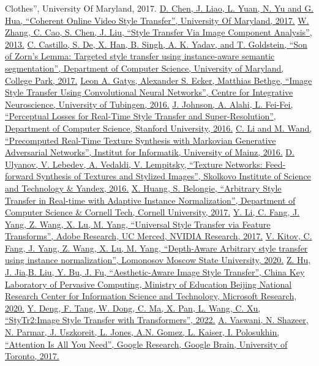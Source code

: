 \documentclass{article}
\begin{document}
\begin{thebibliography}{9}
{    Clothes”,  University Of Maryland, 2017.}
    \href{https://arxiv.org/pdf/1703.09211}{D. Chen, J. Liao, L. Yuan, N. Yu and G. Hua, “Coherent Online Video Style Transfer”,  University Of Maryland, 2017.}
     \href{https://www.researchgate.net/publication/234096926_Style_Transfer_Via_Im  age_Component_Analysis}{W. Zhang, C. Cao, S. Chen, J. Liu, “Style Transfer Via Image Component Analysis”,  2013.}
    \href{https://arxiv.org/pdf/1701.02357}{C. Castillo, S. De, X. Han, B. Singh, A. K. Yadav, and T. Goldstein, “Son of Zorn’s Lemma: Targeted style transfer using instance-aware semantic segmentation”, Department of Computer Science, University of Maryland, College Park, 2017.}
    \href{https://www.cv-foundation.org/openaccess/content_cvpr_2016/papers/Gatys_Image_Style_Transfer_CVPR_2016_paper.pdf}{Leon A. Gatys, Alexander S. Ecker, Matthias Bethge, “Image Style Transfer Using Convolutional Neural Networks”, Centre for Integrative Neuroscience, University of Tubingen, 2016.}
    \href{https://arxiv.org/pdf/1603.08155}{J. Johnson, A. Alahi, L. Fei-Fei, “Perceptual Losses for Real-Time Style Transfer and Super-Resolution”, Department of Computer Science, Stanford University, 2016.}
    \href{https://arxiv.org/pdf/1604.04382}{C. Li and M. Wand, “Precomputed Real-Time Texture Synthesis with Markovian Generative Adversarial Networks”, Institut for Informatik, University of Mainz, 2016.}
    \href{https://arxiv.org/pdf/1603.03417}{D. Ulyanov, V. Lebedev, A. Vedaldi, V. Lempitsky, “Texture Networks: Feed-forward Synthesis of Textures and Stylized Images”, Skolkovo Institute of Science and Technology \& Yandex, 2016.}
    \href{https://arxiv.org/pdf/1703.06868}{X. Huang, S. Belongie, “Arbitrary Style Transfer in Real-time with Adaptive Instance Normalization”, Department of Computer Science \& Cornell Tech, Cornell University, 2017.}
    \href{https://arxiv.org/pdf/1705.08086}{Y. Li, C. Fang, J. Yang, Z. Wang, X. Lu, M. Yang, “Universal Style Transfer via Feature Transforms”, Adobe Research, UC Merced, NVIDIA Research, 2017.}
    \href{https://arxiv.org/pdf/1705.08086}{V. Kitov, C. Fang, J. Yang, Z. Wang, X. Lu, M. Yang, “Depth-Aware Arbitrary style transfer using instance normalization”, Lomonosov Moscow State University, 2020.}
    \href{https://hcsi.cs.tsinghua.edu.cn/Paper/Paper20/MM20-HUZHIYUAN.pdf}{Z. Hu, J. Jia,B. Liu, Y. Bu, J. Fu, “Aesthetic-Aware Image Style Transfer”, China Key Laboratory of Pervasive Computing, Ministry of Education Beijing National Research Center for Information Science and Technology, Microsoft Research, 2020.}
    \href{https://arxiv.org/pdf/2105.14576}{Y. Deng, F. Tang, W. Dong, C. Ma, X. Pan, L. Wang, C. Xu, “StyTr2:Image Style Transfer with Transformers”, 2022.}
   \href{https://arxiv.org/pdf/2105.14576}{A. Vaswani, N. Shazeer, N. Parmar, J. Uszkoreit, L. Jones, A.N. Gomez, L. Kaiser, I. Polosukhin, “Attention Is All You Need”, Google Research, Google Brain, University of Toronto, 2017.}
\end{thebibliography}
\end{document}
